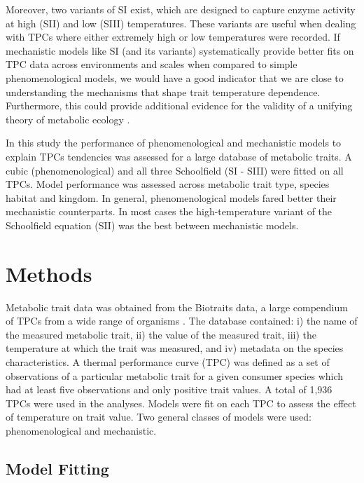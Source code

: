 \documentclass[11pt]{article}  %
\begin{document}
Moreover, two variants of SI exist, which are designed to capture enzyme activity at high (SII) and low (SIII) temperatures. These variants are useful when dealing with TPCs where either extremely high or low temperatures were recorded. If mechanistic models like SI (and its variants) systematically provide better fits on TPC data across environments and scales when compared to simple phenomenological models, we would have a good indicator that we are close to understanding the mechanisms that shape trait temperature dependence. Furthermore, this could provide additional evidence for the validity of a unifying theory of metabolic ecology \cite{Brown}.

In this study the performance of phenomenological and mechanistic models to explain TPCs tendencies was assessed for a large database of metabolic traits. A cubic (phenomenological) and all three Schoolfield (SI - SIII) were fitted on all TPCs. Model performance was assessed across metabolic trait type, species habitat and kingdom. In general, phenomenological models fared better their mechanistic counterparts. In most cases the high-temperature variant of the Schoolfield equation (SII) was the best between mechanistic models.



\section*{Methods}

Metabolic trait data was obtained from the Biotraits data, a large compendium of TPCs from a wide range of organisms \cite{Dell2}. The database contained: i) the name of the measured metabolic trait, ii) the value of the measured trait, iii) the temperature at which the trait was measured, and iv) metadata on the species characteristics. A thermal performance curve (TPC) was defined as a set of observations of a particular metabolic trait for a given consumer species which had at least five observations and only positive trait values. A total of 1,936 TPCs were used in the analyses. Models were fit on each TPC to assess the effect of temperature on trait value. Two general classes of models were used: phenomenological and mechanistic.

\subsection*{Model Fitting}
\end{document}
